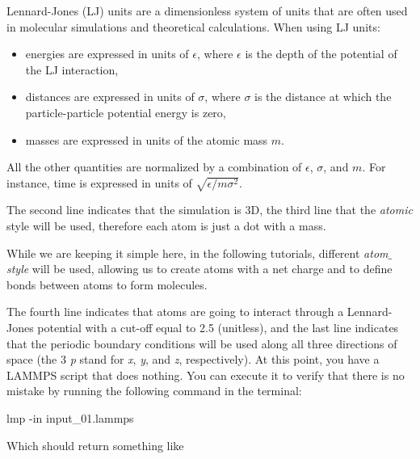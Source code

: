 \begin{tcolorbox}[colback=mylightblue!5!white,colframe=mylightblue!75!black,title=Background Information -- About LJ units]
Lennard-Jones (LJ) units are a dimensionless system of units that are often used in molecular simulations
and theoretical calculations. When using LJ units:
\begin{itemize}
\item energies are expressed in units of $\epsilon$, where $\epsilon$ is the
  depth of the potential of the LJ interaction,
\item distances are expressed in units of $\sigma$, where $\sigma$ is the distance
  at which the particle-particle potential energy is zero,
\item masses are expressed in units of the atomic mass $m$.
\end{itemize}
All the other quantities are normalized by a combination of $\epsilon$, $\sigma$,
and $m$. For instance, time is expressed in units of $\sqrt{ \epsilon / m \sigma^2}$. 
\end{tcolorbox}

The second line indicates that the simulation
is 3D, the third line that the \textit{atomic} style
will be used, therefore each atom is just a dot with a mass.

\begin{tcolorbox}[colback=mylightblue!5!white,colframe=mylightblue!75!black,title=About the atom style]
While we are keeping it simple here,
in the following tutorials, different \textit{atom$\_$style} will be used,
allowing us to create atoms with a net charge and to define 
bonds between atoms to form molecules.
\end{tcolorbox}

The fourth line indicates that atoms are going to interact
through a Lennard-Jones potential with a cut-off equal to
2.5 (unitless), and the last line indicates that the
periodic boundary conditions will be used along all three
directions of space (the 3 \textit{p} stand for \textit{x}, \textit{y}, and \textit{z},
respectively).
At this point, you have a LAMMPS script that does nothing.
You can execute it to verify that there is no mistake by
running the following command in the terminal:

\begin{lcverbatim}
lmp -in input_01.lammps
\end{lcverbatim}

\noindent Which should return something like

